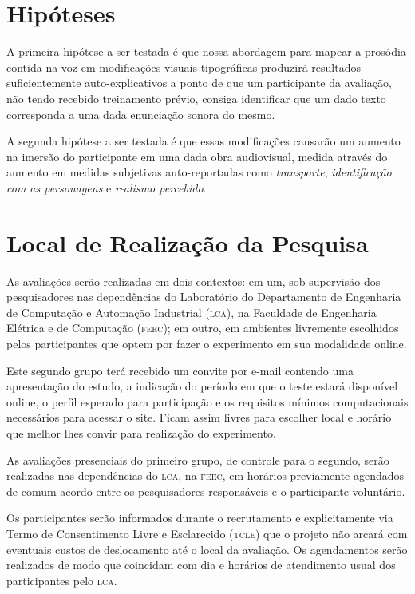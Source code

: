 \documentclass[a4paper,11pt,titlepage,singlespacing]{article}
\begin{document}
\section{Hipóteses}

\noindent A primeira hipótese a ser testada é que nossa abordagem para mapear a prosódia contida na voz em modificações visuais tipográficas produzirá resultados suficientemente auto-explicativos a ponto de que um participante da avaliação, não tendo recebido treinamento prévio, consiga identificar que um dado texto corresponda a uma dada enunciação sonora do mesmo.

A segunda hipótese a ser testada é que essas modificações causarão um aumento na imersão do participante em uma dada obra audiovisual, medida através do aumento em medidas subjetivas auto-reportadas como \textit{transporte}, \textit{identificação com as personagens} e \textit{realismo percebido}.

\section{Local de Realização da Pesquisa}

\noindent As avaliações serão realizadas em dois contextos: em um, sob supervisão dos pesquisadores nas dependências do Laboratório do Departamento de Engenharia de Computação e Automação Industrial (\textsc{lca}), na Faculdade de Engenharia Elétrica e de Computação (\textsc{feec}); em outro, em ambientes livremente escolhidos pelos participantes que optem por fazer o experimento em sua modalidade online. 

Este segundo grupo terá recebido um convite por e-mail contendo uma apresentação do estudo, a indicação do período em que o teste estará disponível online, o perfil esperado para participação e os requisitos mínimos computacionais necessários para acessar o site. Ficam assim livres para escolher local e horário que melhor lhes convir para realização do experimento.

As avaliações presenciais do primeiro grupo, de controle para o segundo, serão realizadas nas dependências do \textsc{lca}, na \textsc{feec}, em horários previamente agendados de comum acordo entre os pesquisadores responsáveis e o participante voluntário.

Os participantes serão informados durante o recrutamento e explicitamente via Termo de Consentimento Livre e Esclarecido (\textsc{tcle}) que o projeto não arcará com eventuais custos de deslocamento até o local da avaliação. Os agendamentos serão realizados de modo que coincidam com dia e horários de atendimento usual dos participantes pelo \textsc{lca}.
\end{document}
